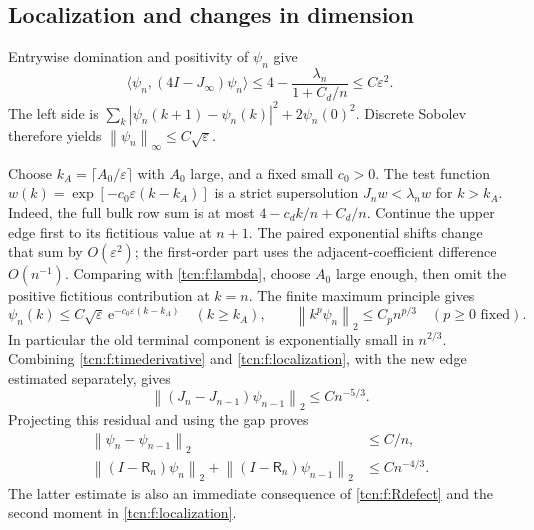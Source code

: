\documentclass[11pt,letterpaper]{article}
\newcommand{\norm}[1]{\left\lVert#1\right\rVert}
\newcommand{\ip}[2]{\langle#1,#2\rangle}
\newcommand{\eps}{\varepsilon}
\newcommand{\ee}{\mathrm e}
\theoremstyle{remark}
\begin{document}
\subsection{Localization and changes in dimension}
Entrywise domination and positivity of $\psi_n$ give
\[
 \ip{\psi_n}{(4I-J_\infty)\psi_n}
 \le4-\frac{\lambda_n}{1+C_d/n}\le C\eps^2.
\]
The left side is $\sum_k|\psi_n(k+1)-\psi_n(k)|^2+2\psi_n(0)^2$. Discrete Sobolev therefore yields $\norm{\psi_n}_\infty\le C\sqrt\eps$.

Choose $k_A=\lceil A_0/\eps\rceil$ with $A_0$ large, and a fixed small $c_0>0$. The test function $w(k)=\exp[-c_0\eps(k-k_A)]$ is a strict supersolution $J_nw<\lambda_nw$ for $k>k_A$. Indeed, the full bulk row sum is at most $4-c_dk/n+C_d/n$. Continue the upper edge first to its fictitious value at $n+1$. The paired exponential shifts change that sum by $O(\eps^2)$; the first-order part uses the adjacent-coefficient difference $O(n^{-1})$. Comparing with \eqref{tcn:f:lambda}, choose $A_0$ large enough, then omit the positive fictitious contribution at $k=n$. The finite maximum principle gives
\begin{equation}\label{tcn:f:localization}
 \psi_n(k)\le C\sqrt\eps\,\ee^{-c_0\eps(k-k_A)}\quad(k\ge k_A),\qquad
 \norm{k^p\psi_n}_2\le C_p n^{p/3}\quad(p\ge0\text{ fixed}).
\end{equation}
In particular the old terminal component is exponentially small in $n^{2/3}$. Combining \eqref{tcn:f:timederivative} and \eqref{tcn:f:localization}, with the new edge estimated separately, gives
\[
 \norm{(J_n-J_{n-1})\psi_{n-1}}_2\le Cn^{-5/3}.
\]
Projecting this residual and using the gap proves
\begin{align}
 \norm{\psi_n-\psi_{n-1}}_2&\le C/n,\label{tcn:f:drift}\\
 \norm{(I-\mathsf R_n)\psi_n}_2+\norm{(I-\mathsf R_n)\psi_{n-1}}_2
                                      &\le Cn^{-4/3}.\label{tcn:f:Rperron}
\end{align}
The latter estimate is also an immediate consequence of \eqref{tcn:f:Rdefect} and the second moment in \eqref{tcn:f:localization}.
\end{document}
